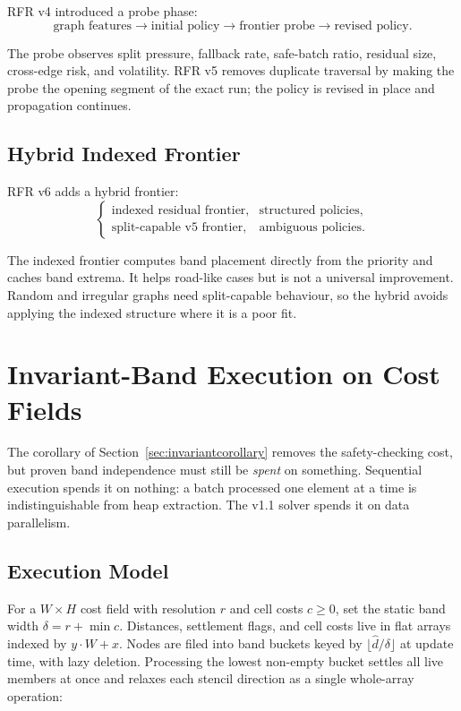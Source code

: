 \documentclass[11pt]{article}
\begin{document}
RFR v4 introduced a probe phase:
\[
  \text{graph features} \rightarrow \text{initial policy}
  \rightarrow \text{frontier probe}
  \rightarrow \text{revised policy}.
\]

The probe observes split pressure, fallback rate, safe-batch ratio, residual size, cross-edge risk, and volatility. RFR v5 removes duplicate traversal by making the probe the opening segment of the exact run; the policy is revised in place and propagation continues.

\subsection{Hybrid Indexed Frontier}

RFR v6 adds a hybrid frontier:
\[
  \begin{cases}
    \text{indexed residual frontier}, & \text{structured policies},\\
    \text{split-capable v5 frontier}, & \text{ambiguous policies}.
  \end{cases}
\]

The indexed frontier computes band placement directly from the priority and caches band extrema. It helps road-like cases but is not a universal improvement. Random and irregular graphs need split-capable behaviour, so the hybrid avoids applying the indexed structure where it is a poor fit.

\section{Invariant-Band Execution on Cost Fields}
\label{sec:invariant}

The corollary of Section~\ref{sec:invariantcorollary} removes the safety-checking cost, but proven band independence must still be \emph{spent} on something. Sequential execution spends it on nothing: a batch processed one element at a time is indistinguishable from heap extraction. The v1.1 solver spends it on data parallelism.

\subsection{Execution Model}

For a $W\times H$ cost field with resolution $r$ and cell costs $c\ge 0$, set the static band width $\delta = r + \min c$. Distances, settlement flags, and cell costs live in flat arrays indexed by $y\cdot W+x$. Nodes are filed into band buckets keyed by $\lfloor \hat d/\delta\rfloor$ at update time, with lazy deletion. Processing the lowest non-empty bucket settles all live members at once and relaxes each stencil direction as a single whole-array operation:
\end{document}
